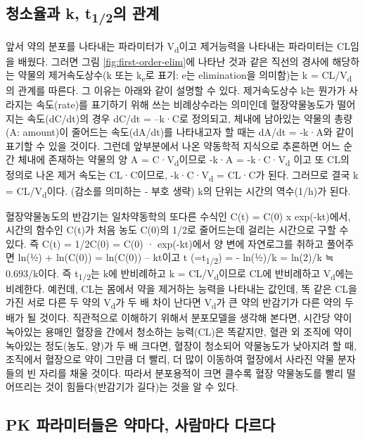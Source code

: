 \documentclass[
  11pt,
  krantz2, a4paper, twoside]{krantz}
\begin{document}
\hypertarget{uxccaduxc18cuxc728uxacfc-k-t12uxc758-uxad00uxacc4}{%
\subsection{\texorpdfstring{청소율과 k, t\textsubscript{1/2}의 관계}{청소율과 k, t1/2의 관계}}\label{uxccaduxc18cuxc728uxacfc-k-t12uxc758-uxad00uxacc4}}

앞서 약의 분포를 나타내는 파라미터가 V\textsubscript{d}이고 제거능력을 나타내는 파라미터는 CL임을 배웠다.
그러면 그림 \ref{fig:first-order-elim}에 나타난 것과 같은 직선의 경사에 해당하는 약물의 제거속도상수(k 또는 k\textsubscript{e}로 표기: e는 elimination을 의미함)는 k = CL/V\textsubscript{d}의 관계를 따른다.
그 이유는 아래와 같이 설명할 수 있다.
제거속도상수 k는 뭔가가 사라지는 속도(rate)를 표기하기 위해 쓰는 비례상수라는 의미인데 혈장약물농도가 떨어지는 속도(dC/dt)의 경우 dC/dt = --k·C로 정의되고, 체내에 남아있는 약물의 총량(A: amount)이 줄어드는 속도(dA/dt)를 나타내고자 할 때는 dA/dt = -k·A와 같이 표기할 수 있을 것이다. 그런데 앞부분에서 나온 약동학적 지식으로 추론하면 어느 순간 체내에 존재하는 약물의 양 A = C·V\textsubscript{d}이므로 -k·A = -k·C·V\textsubscript{d} 이고 또 CL의 정의로 나온 제거 속도는 CL·C이므로, -k·C·V\textsubscript{d} = CL·C가 된다.
그러므로 결국 k = CL/V\textsubscript{d}이다. (감소를 의미하는 - 부호 생략) k의 단위는 시간의 역수(1/h)가 된다.

혈장약물농도의 반감기는 일차약동학의 또다른 수식인 C(t) = C(0) x exp(-kt)에서, 시간의 함수인 C(t)가 처음 농도 C(0)의 1/2로 줄어드는데 걸리는 시간으로 구할 수 있다.
즉 C(t) = 1/2C(0) = C(0) · exp(-kt)에서 양 변에 자연로그를 취하고 풀어주면 ln(½) + ln(C(0)) = ln(C(0)) -- kt이고 t (=t\textsubscript{1/2}) = - ln(½)/k = ln(2)/k ≒ 0.693/k이다.
즉 t\textsubscript{1/2}는 k에 반비례하고 k = CL/V\textsubscript{d}이므로 CL에 반비례하고 V\textsubscript{d}에는 비례한다.
예컨데, CL는 몸에서 약을 제거하는 능력을 나타내는 값인데, 똑 같은 CL을 가진 서로 다른 두 약의 V\textsubscript{d}가 두 배 차이 난다면 V\textsubscript{d}가 큰 약의 반감기가 다른 약의 두 배가 될 것이다.
직관적으로 이해하기 위해서 분포모델을 생각해 본다면, 시간당 약이 녹아있는 용매인 혈장을 간에서 청소하는 능력(CL)은 똑같지만, 혈관 외 조직에 약이 녹아있는 정도(농도, 양)가 두 배 크다면, 혈장이 청소되어 약물농도가 낮아지려 할 때, 조직에서 혈장으로 약이 그만큼 더 빨리, 더 많이 이동하여 혈장에서 사라진 약물 분자들의 빈 자리를 채울 것이다.
따라서 분포용적이 크면 클수록 혈장 약물농도를 빨리 떨어뜨리는 것이 힘들다(반감기가 길다)는 것을 알 수 있다.

\hypertarget{pk-uxd30cuxb77cuxbbf8uxd130uxb4e4uxc740-uxc57duxb9c8uxb2e4-uxc0acuxb78cuxb9c8uxb2e4-uxb2e4uxb974uxb2e4}{%
\subsection{PK 파라미터들은 약마다, 사람마다 다르다}\label{pk-uxd30cuxb77cuxbbf8uxd130uxb4e4uxc740-uxc57duxb9c8uxb2e4-uxc0acuxb78cuxb9c8uxb2e4-uxb2e4uxb974uxb2e4}}
\end{document}
